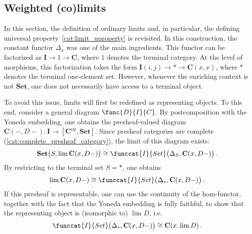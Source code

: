 \subsection{Weighted (co)limits}

    In this section, the definition of ordinary limits and, in particular, the defining universal property~\ref{cat:limit_uproperty} is revisited. In this construction, the constant functor $\Delta_x$ was one of the main ingredients. This functor can be factorized as $\mathbf{I}\rightarrow1\rightarrow\mathbf{C}$, where $1$ denotes the terminal category. At the level of morphisms, this factorization takes the form $\mathbf{I}(i,j)\rightarrow\ast\rightarrow\mathbf{C}(x,x)$, where $\ast$ denotes the terminal one-element set. However, whenever the enriching context is not $\mathbf{Set}$, one does not necessarily have access to a terminal object.

    To avoid this issue, limits will first be redefined as representing objects. To this end, consider a general diagram $\func{D}{I}{C}$. By postcomposition with the Yoneda embedding, one obtains the presheaf-valued diagram $\mathbf{C}(-,D-):\mathbf{I}\rightarrow[\mathbf{C}^{\text{op}},\mathbf{Set}]$. Since presheaf categories are complete (\cref{cat:complete_presheaf_category}), the limit of this diagram exists:
    \begin{gather}
        \mathbf{Set}\bigl(S,\lim\mathbf{C}(x,D-)\bigr)\cong\funccat{I}{Set}\bigl(\Delta_S,\mathbf{C}(x,D-)\bigr)\,.
    \end{gather}
    By restricting to the terminal set $S=\ast$, one obtains
    \begin{gather}
        \lim\mathbf{C}(x,D-)\cong\funccat{I}{Set}\bigl(\Delta_\ast,\mathbf{C}(x,D-)\bigr)\,.
    \end{gather}
    If this presheaf is representable, one can use the continuity of the hom-functor, together with the fact that the Yoneda embedding is fully faithful, to show that the representing object is (isomorphic to) $\lim D$, i.e.
    \begin{gather}
        \funccat{I}{Set}\bigl(\Delta_\ast,\mathbf{C}(x,D-)\bigr)\cong\mathbf{C}(x,\lim D)\,.
    \end{gather}



